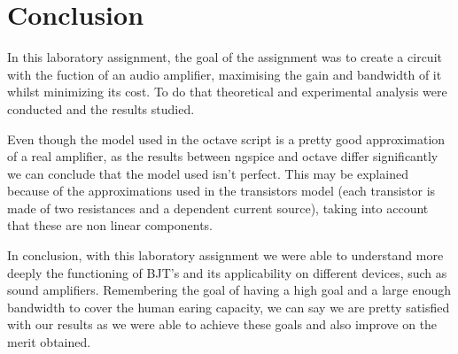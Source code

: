 \section{Conclusion}
\label{sec:conclusion}

\par In this laboratory assignment, the goal of the assignment was to create a circuit with the fuction of an audio amplifier, maximising the gain and bandwidth of it whilst minimizing its cost. To do that theoretical and experimental analysis were conducted and the results studied.

\par Even though the model used in the octave script is a pretty good approximation of a real amplifier, as the results between ngspice and octave differ significantly we can conclude that the model used isn't perfect. This may be explained because of the approximations used in the transistors model (each transistor is made of two resistances and a dependent current source), taking into account that these are non linear components. 
 
\par In conclusion, with this laboratory assignment we were able to understand more deeply the functioning of BJT's and its applicability on different devices, such as sound amplifiers. Remembering the goal of having a high goal and a large enough bandwidth to cover the human earing capacity, we can say we are pretty satisfied with our results as we were able to achieve these goals and also improve on the merit obtained.
